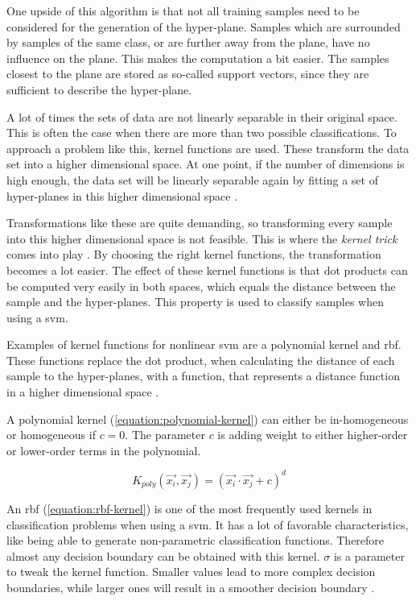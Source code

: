 One upside of this algorithm is that not all training samples need to be considered for the generation of the hyper-plane. Samples which are surrounded by samples of the same class, or are further away from the plane, have no influence on the plane. This makes the computation a bit easier. The samples closest to the plane are stored as so-called support vectors, since they are sufficient to describe the hyper-plane.

A lot of times the sets of data are not linearly separable in their original space. This is often the case when there are more than two possible classifications. To approach a problem like this, kernel functions are used. These transform the data set into a higher dimensional space. At one point, if the number of dimensions is high enough, the data set will be linearly separable again by fitting a set of hyper-planes in this higher dimensional space \autocite[]{vert2004primer}.

Transformations like these are quite demanding, so transforming every sample into this higher dimensional space is not feasible. This is where the \textit{kernel trick} comes into play \autocite[]{vert2004primer}. By choosing the right kernel functions, the transformation becomes a lot easier. The effect of these kernel functions is that dot products can be computed very easily in both spaces, which equals the distance between the sample and the hyper-planes. This property is used to classify samples when using a \gls{svm}.

Examples of kernel functions for nonlinear \gls{svm} are a polynomial kernel and \gls{rbf}. These functions replace the dot product, when calculating the distance of each sample to the hyper-planes, with a function, that represents a distance function in a higher dimensional space \autocite{vert2004primer}.

A polynomial kernel (\ref{equation:polynomial-kernel}) can either be in-homogeneous or homogeneous if $c = 0$. The parameter $c$ is adding weight to either higher-order or lower-order terms in the polynomial.

\begin{equation}
    K_{poly}(\vec{x_{i}},\vec{x_{j}})=(\vec{x_{i}}\cdot\vec{x_{j}}+c)^{d}
    \label{equation:polynomial-kernel}
\end{equation}

An \gls{rbf} (\ref{equation:rbf-kernel}) is one of the most frequently used kernels in classification problems when using a \gls{svm}. It has a lot of favorable characteristics, like being able to generate non-parametric classification functions. Therefore almost any decision boundary can be obtained with this kernel. $\sigma$ is a parameter to tweak the kernel function. Smaller values lead to more complex decision boundaries, while larger ones will result in a smoother decision boundary \autocite{vert2004primer}.

